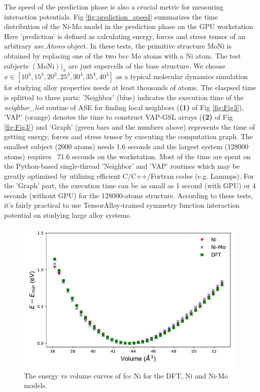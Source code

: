 \documentclass[preprint]{revtex4-2}
\begin{document}
The speed of the prediction phase is also a crucial metric for measuring 
interaction potentials. Fig \ref{fig:prediction_speed} summarizes the time 
distribution of the Ni-Mo model in the prediction phase on the GPU workstation. 
Here 'prediction' is defined as calculating energy, forces and stress tensor of 
an arbitrary \textit{ase.Atoms} object. In these tests, the primitive structure
$\mathrm{MoNi}$ is obtained by replacing one of the two bcc Mo atoms with a Ni 
atom. The test subjects $(\mathrm{MoNi}))_{x}$ are just supercells of the base 
structure. We choose $x \in [10^3, 15^3, 20^3, 25^3, 30^3, 35^3, 40^3]$ as
a typical molecular dynamics simulation for studying alloy properties needs at 
least thousands of atoms. The elaspsed time is splitted to three parts: 
'Neighbor' (blue) indicates the execution time of the \textit{neighbor\_list} 
routine of ASE for finding local neighbors (\textbf{(1)} of Fig \ref{fig:Fig3}),
'VAP' (orange) denotes the time to construct VAP-GSL arrays 
(\textbf{(2)} of Fig \ref{fig:Fig3}) and 'Graph' (green bars and the numbers 
above) represents the time of getting energy, forces and stress tensor by 
executing the computation graph. The smallest subject (2000 atoms) needs 1.6 
seconds and the largest system (128000 atoms) requires ~71.6 seconds on the 
workstation. Most of the time are spent on the Python-based single-thread 
'Neighbor' and 'VAP' routines \textemdash which may be greatly optimized by 
utilizing efficient C/C++/Fortran codes (e.g. Lammps). For the 'Graph' part, the 
execution time can be as small as 1 second (with GPU) or 4 seconds (without GPU) 
for the 128000-atoms structure. According to these tests, it's fairly practical 
to use TensorAlloy-trained symmetry function interaction potential on studying 
large alloy systems.

% 
%
\begin{figure}[h!]
    \centering
    \includegraphics[scale=0.8]{figures/Ni_EoS.pdf}
\caption{\label{fig:energy_volume_Ni} The energy vs volume curves of fcc Ni for
the DFT, Ni and Ni-Mo models.}
\end{figure}
\end{document}
